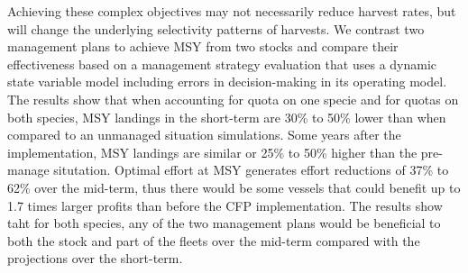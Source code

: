 \documentclass[12pt,oneline,a4paper,numbib]{ouparticle}
\numberwithin{equation}{subsection} %
\begin{document}
Achieving these complex objectives may not necessarily reduce harvest rates, but will change the underlying selectivity patterns of harvests. We contrast two management plans to achieve MSY from two stocks and compare their effectiveness based on a management strategy evaluation that uses a dynamic state variable model including errors in decision-making in its operating model. The results show that when accounting for quota on one specie and for quotas on both species, MSY landings in the short-term are 30\% to 50\% lower than when compared to an unmanaged situation simulations. Some years after the implementation, MSY landings are similar or 25\% to 50\% higher than the pre-manage situtation. Optimal effort at MSY generates effort reductions of 37\% to 62\% over the mid-term, thus there would be some vessels that could benefit up to 1.7 times larger profits than before the CFP implementation. The results show taht for both species, any of the two management plans would be beneficial to both the stock and part of the fleets over the mid-term compared with the projections over the short-term.
 
\end{document}
